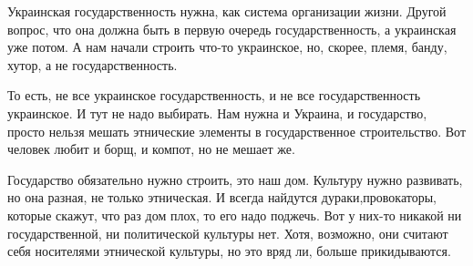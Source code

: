 Украинская государственность нужна, как система организации жизни. Другой
вопрос, что она должна быть в первую очередь государственность, а украинская
уже потом. А нам начали строить что-то украинское, но, скорее, племя, банду,
хутор, а не государственность. 

То есть, не все украинское государственность, и не все государственность
украинское. И тут не надо выбирать. Нам нужна и Украина, и государство, просто
нельзя мешать этнические элементы в государственное строительство. Вот человек
любит и борщ, и компот, но не мешает же. 

Государство обязательно нужно строить, это наш дом. Культуру нужно развивать,
но она разная, не только этническая. И всегда найдутся дураки,провокаторы,
которые скажут, что раз дом плох, то его надо поджечь. Вот у них-то никакой ни
государственной, ни политической культуры нет. Хотя, возможно, они считают себя
носителями этнической культуры, но это вряд ли, больше прикидываются.
